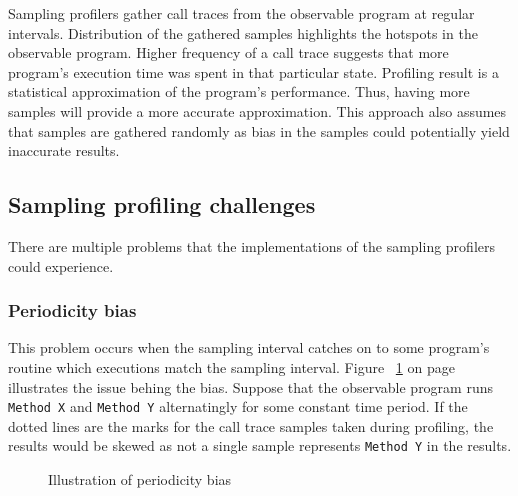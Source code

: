 \documentclass[..thesis.tex]{subfiles}
\begin{document}


Sampling profilers gather call traces from the observable program at regular intervals. Distribution of the gathered samples highlights the hotspots in the observable program. Higher frequency of a call trace suggests that more program's execution time was spent in that particular state. Profiling result is a statistical approximation of the program's performance. Thus, having more samples will provide a more accurate approximation. This approach also assumes that samples are gathered randomly as bias in the samples could potentially yield inaccurate results. 

\subsection{Sampling profiling challenges}
There are multiple problems that the implementations of the sampling profilers could experience.
\subsubsection{Periodicity bias}
This problem occurs when the sampling interval catches on to some program's routine which executions match the sampling interval. Figure ~\ref{fig:periodicityBias} on page ~\pageref{fig:periodicityBias} illustrates the issue behing the bias. Suppose that the observable program runs \texttt{Method X} and \texttt{Method Y} alternatingly for some constant time period. If the dotted lines are the marks for the call trace samples taken during profiling, the results would be skewed as not a single sample represents \texttt{Method Y} in the results.

\begin{figure}[H]
\centering
{}
\caption{Illustration of periodicity bias}
\label{fig:periodicityBias}
\end{figure}
\end{document}
